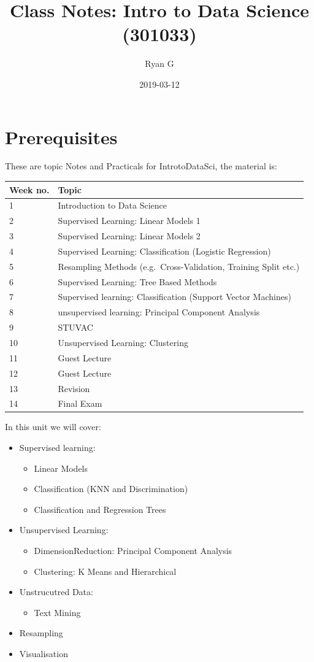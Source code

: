 \documentclass[]{book}
\title{Class Notes: Intro to Data Science (301033)}
\author{Ryan G}
\date{2019-03-12}
\providecommand{\tightlist}{%
  \setlength{\itemsep}{0pt}\setlength{\parskip}{0pt}}
\begin{document}
\maketitle

{
\setcounter{tocdepth}{1}
\tableofcontents
}
\hypertarget{prerequisites}{%
\chapter{Prerequisites}\label{prerequisites}}

These are topic Notes and Practicals for IntrotoDataSci, the material is:

\begin{longtable}[]{@{}ll@{}}
\toprule
Week no. & Topic\tabularnewline
\midrule
\endhead
1 & Introduction to Data Science\tabularnewline
2 & Supervised Learning: Linear Models 1\tabularnewline
3 & Supervised Learning: Linear Models 2\tabularnewline
4 & Supervised Learning: Classification (Logistic Regression)\tabularnewline
5 & Resampling Methods (e.g.~Cross-Validation, Training Split etc.)\tabularnewline
6 & Supervised Learning: Tree Based Methods\tabularnewline
7 & Supervised learning: Classification (Support Vector Machines)\tabularnewline
8 & unsupervised learning: Principal Component Analysis\tabularnewline
9 & STUVAC\tabularnewline
10 & Unsupervised Learning: Clustering\tabularnewline
11 & Guest Lecture\tabularnewline
12 & Guest Lecture\tabularnewline
13 & Revision\tabularnewline
14 & Final Exam\tabularnewline
\bottomrule
\end{longtable}

In this unit we will cover:

\begin{itemize}
\tightlist
\item
  Supervised learning:

  \begin{itemize}
  \tightlist
  \item
    Linear Models
  \item
    Classification (KNN and Discrimination)
  \item
    Classification and Regression Trees
  \end{itemize}
\item
  Unsupervised Learning:

  \begin{itemize}
  \tightlist
  \item
    DimensionReduction: Principal Component Analysis
  \item
    Clustering: K Means and Hierarchical
  \end{itemize}
\item
  Unstrucutred Data:

  \begin{itemize}
  \tightlist
  \item
    Text Mining
  \end{itemize}
\item
  Resampling
\item
  Visualisation
\end{itemize}
\end{document}
